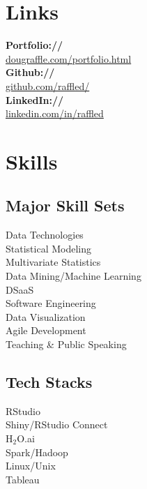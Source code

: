 \documentclass[letterpaper]{deedy-resume} %
\begin{document}
\begin{minipage}[t]{0.3\textwidth}
  \section{Links} 
  {\bf Portfolio://}\\ \href{http://www.dougraffle.com/portfolio.html}{dougraffle.com/portfolio.html}\\
  {\bf Github://}\\ \href{http://github.com/raffled/}{github.com/raffled/}\\
  {\bf LinkedIn://}\\ \href{https://www.linkedin.com/in/raffled}{linkedin.com/in/raffled} \\
  \sectionspace %
  \sectionspace

  \section{Skills}
  \subsection{Major Skill Sets}
  Data Technologies\\
  Statistical Modeling\\
  Multivariate Statistics\\
  Data Mining/Machine Learning\\
  DSaaS\\
  Software Engineering\\
  Data Visualization\\
  Agile Development\\
  Teaching \& Public Speaking\\

  \sectionspace %
  \vspace{3pt}

  \subsection{Tech Stacks}
  RStudio\\
  Shiny/RStudio Connect\\
  H$_2$O.ai\\
  Spark/Hadoop\\
  Linux/Unix\\
  Tableau


\end{minipage}
\end{document}
